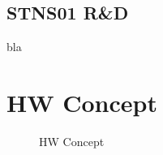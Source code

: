 \subsection{STNS01 R\&D}
\label{ssec:STNS01}
bla

\section{HW Concept}
\label{sec:HW Concept}
\begin{figure}[H]
	\centering
	\caption{HW Concept}
	\label{fig:HW Concept}
\end{figure}
